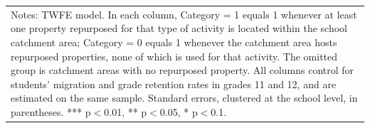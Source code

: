 \documentclass[12pt]{article}
\theoremstyle{plain}
\theoremstyle{plain}
\theoremstyle{plain}
\theoremstyle{definition}
\theoremstyle{plain}
\theoremstyle{definition}
\theoremstyle{plain}
\theoremstyle{remark}
\theoremstyle{definition}
\theoremstyle{definition}
\theoremstyle{plain}
\begin{document}
\begin{table}[H]
{\begin{tabular}{p{12.39em}llll}
			\midrule
			\multicolumn{5}{p{32.39em}}{Notes: TWFE model. In each column, Category = 1 equals 1 whenever at least one property repurposed for that type of activity is located within the school catchment area; Category = 0 equals 1 whenever the catchment area hosts repurposed properties, none of which is used for that activity. The omitted group is catchment areas with no repurposed property. All columns control for students' migration and grade retention rates in grades 11 and 12, and are estimated on the same sample. Standard errors, clustered at the school level, in parentheses. *** p$<$0.01, ** p$<$0.05, * p$<$0.1.} \\
		\end{tabular}%
	}
\end{table}
\end{document}
